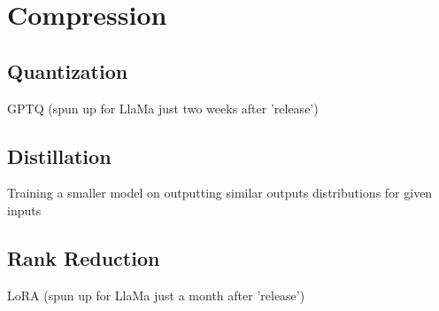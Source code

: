 \section{Compression}
\subsection{Quantization}
\begin{frame}[c]
    GPTQ \cite{frantar_gptq_2022}
    (spun up for LlaMa just two weeks after 'release')
\end{frame}

\subsection{Distillation}
\begin{frame}[c]
    Training a smaller model on outputting similar outputs distributions for given inputs
    \cite{sun_patient_2019}
    \cite{polino_model_2018}
\end{frame}

\subsection{Rank Reduction}
\begin{frame}[c]
    LoRA \cite{hu_lora_2021}
    (spun up for LlaMa just a month after 'release')
\end{frame}
